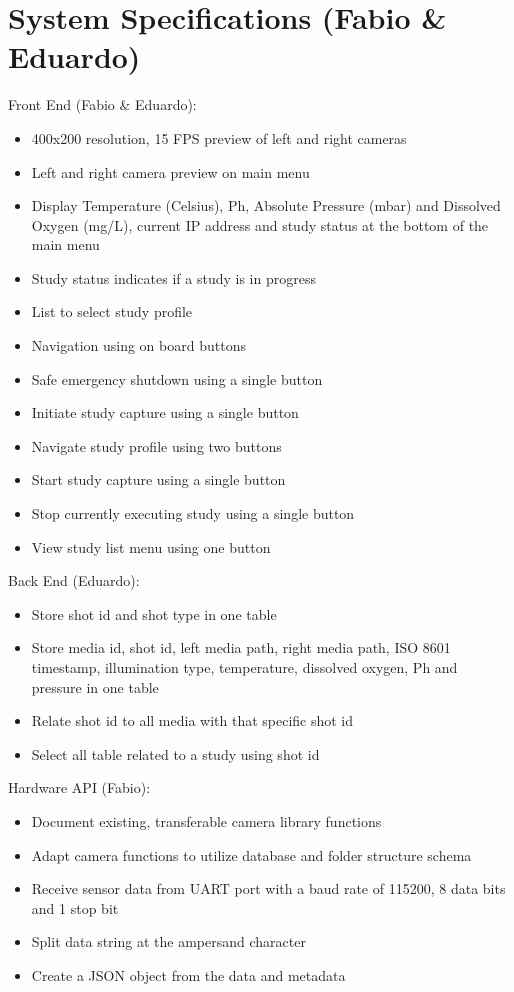\section{System Specifications (Fabio \& Eduardo)}
Front End (Fabio \& Eduardo):
\begin{itemize}
	\item 400x200 resolution, 15 FPS preview of left and right cameras
	\item Left and right camera preview on main menu
	\item Display Temperature (Celsius), Ph, Absolute Pressure (mbar) and Dissolved Oxygen (mg/L), current IP address and study status at the bottom of the main menu
	\item Study status indicates if a study is in progress
	\item List to select study profile
	\item Navigation using on board buttons
	\item Safe emergency shutdown using a single button
	\item Initiate study capture using a single button
	\item Navigate study profile using two buttons
	\item Start study capture using a single button
	\item Stop currently executing study using a single button
	\item View study list menu using one button
\end{itemize}
Back End (Eduardo):
\begin{itemize}
	\item Store shot id and shot type in one table
	\item Store media id, shot id, left media path, right media path, ISO 8601 timestamp, illumination type, temperature, dissolved oxygen, Ph and pressure in one table
	\item Relate shot id to all media with that specific shot id
	\item Select all table related to a study using shot id
\end{itemize}
Hardware API (Fabio):
\begin{itemize}
	\item Document existing, transferable camera library functions
	\item Adapt camera functions to utilize database and folder structure schema
	\item Receive sensor data from UART port with a baud rate of 115200, 8 data bits and 1 stop bit
	\item Split data string at the ampersand character
	\item Create a JSON object from the data and metadata
\end{itemize}
